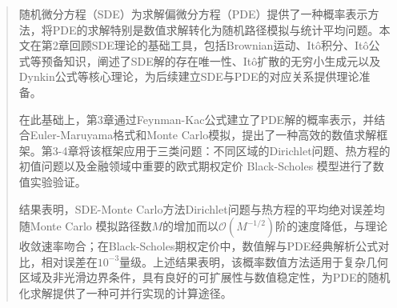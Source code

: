 \documentclass[oneside]{sysuthesis}
\begin{document}
\maketitle
\frontmatter

\begin{abstract}
   随机微分方程（SDE）为求解偏微分方程（PDE）提供了一种概率表示方法，将PDE的求解特别是数值求解转化为随机路径模拟与统计平均问题。本文在第2章回顾SDE理论的基础工具，包括Brownian运动、It\^o积分、It\^o公式等预备知识，阐述了SDE解的存在唯一性、It\^o扩散的无穷小生成元以及Dynkin公式等核心理论，为后续建立SDE与PDE的对应关系提供理论准备。
  
  在此基础上，第3章通过Feynman-Kac公式建立了PDE解的概率表示，并结合Euler-Maruyama格式和Monte Carlo模拟，提出了一种高效的数值求解框架。第3-4章将该框架应用于三类问题：不同区域的Dirichlet问题、热方程的初值问题以及金融领域中重要的欧式期权定价 Black-Scholes 模型进行了数值实验验证。
  
  结果表明，SDE-Monte Carlo方法Dirichlet问题与热方程的平均绝对误差均随Monte Carlo 模拟路径数$M$的增加而以$\mathcal{O}(M^{-1/2})$阶的速度降低，与理论收敛速率吻合；在Black-Scholes期权定价中，数值解与PDE经典解析公式对比，相对误差在$10^{-3}$量级。上述结果表明，该概率数值方法适用于复杂几何区域及非光滑边界条件，具有良好的可扩展性与数值稳定性，为PDE的随机化求解提供了一种可并行实现的计算途径。
\end{abstract}
\end{document}
